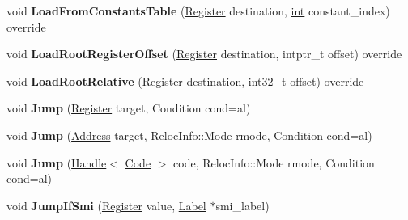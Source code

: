 \begin{DoxyCompactItemize}
\item 
\mbox{\label{classv8_1_1internal_1_1TurboAssembler_a6c8fae865ac1fd7f79f9d4934a46392a}} 
void {\bfseries Load\+From\+Constants\+Table} (\mbox{\hyperlink{classv8_1_1internal_1_1Register}{Register}} destination, \mbox{\hyperlink{classint}{int}} constant\+\_\+index) override
\item 
\mbox{\label{classv8_1_1internal_1_1TurboAssembler_a20588856c39f30350ccd570332e761ea}} 
void {\bfseries Load\+Root\+Register\+Offset} (\mbox{\hyperlink{classv8_1_1internal_1_1Register}{Register}} destination, intptr\+\_\+t offset) override
\item 
\mbox{\label{classv8_1_1internal_1_1TurboAssembler_a77e9d10255bc9a25985ff71df883e665}} 
void {\bfseries Load\+Root\+Relative} (\mbox{\hyperlink{classv8_1_1internal_1_1Register}{Register}} destination, int32\+\_\+t offset) override
\item 
\mbox{\label{classv8_1_1internal_1_1TurboAssembler_a00b649e07417eefbf242c5583f9bb1d2}} 
void {\bfseries Jump} (\mbox{\hyperlink{classv8_1_1internal_1_1Register}{Register}} target, Condition cond=al)
\item 
\mbox{\label{classv8_1_1internal_1_1TurboAssembler_a70d82703c3ebf605197b18749ac052ba}} 
void {\bfseries Jump} (\mbox{\hyperlink{classuintptr__t}{Address}} target, Reloc\+Info\+::\+Mode rmode, Condition cond=al)
\item 
\mbox{\label{classv8_1_1internal_1_1TurboAssembler_a51d9089ea6fb8d14ac1281bd3063b9c1}} 
void {\bfseries Jump} (\mbox{\hyperlink{classv8_1_1internal_1_1Handle}{Handle}}$<$ \mbox{\hyperlink{classv8_1_1internal_1_1Code}{Code}} $>$ code, Reloc\+Info\+::\+Mode rmode, Condition cond=al)
\item 
\mbox{\label{classv8_1_1internal_1_1TurboAssembler_ada5413869bfc081b99ba85a5beeb183a}} 
void {\bfseries Jump\+If\+Smi} (\mbox{\hyperlink{classv8_1_1internal_1_1Register}{Register}} value, \mbox{\hyperlink{classv8_1_1internal_1_1Label}{Label}} $\ast$smi\+\_\+label)

\end{DoxyCompactItemize}

